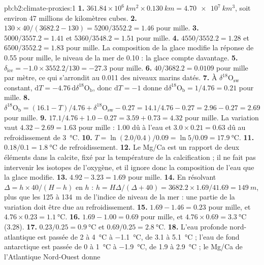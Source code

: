 \begin{solution}{pb:b2:climate-proxies:1}
\textbf{1.} $361.84 \times 10^6\ \unit{km^2} \times \qty{0.130}{km} = \qty{4.70e7}{km^3}$, soit environ 47
millions de kilomètres cubes.
\textbf{2.} $130 \times 40/(3682.2 - 130) = 5200/3552.2 = 1.46$ pour mille.
\textbf{3.} $5000/3557.2 = 1.41$ et $5360/3548.2 = 1.51$ pour mille.
\textbf{4.} $4550/3552.2 = 1.28$ et $6500/3552.2 = 1.83$ pour mille. La composition de la glace
modifie la réponse de \num{0.55} pour mille, le niveau de la mer de \num{0.10} : la glace compte davantage.
\textbf{5.} $\delta_{\mathrm{ice}} = -1.0 \times 3552.2/130 = -27.3$ pour mille.
\textbf{6.} $40/3682.2 = 0.0109$ pour mille par mètre, ce qui s'arrondit au \num{0.011} des niveaux marins
datés.
\textbf{7.} À $\delta^{18}\mathrm{O}_{\mathrm{sw}}$ constant, $\mathrm{d}T = -4.76\,\mathrm{d}\delta^{18}
\mathrm{O}_{\mathrm{b}}$, donc $\mathrm{d}T = -1$ donne $\mathrm{d}\delta^{18}\mathrm{O}_{\mathrm{b}} =
1/4.76 = 0.21$ pour mille.
\textbf{8.} $\delta^{18}\mathrm{O}_{\mathrm{b}} = (16.1 - T)/4.76 + \delta^{18}\mathrm{O}_{\mathrm{sw}}
- 0.27 = 14.1/4.76 - 0.27 = 2.96 - 0.27 = 2.69$ pour mille.
\textbf{9.} $17.1/4.76 + 1.0 - 0.27 = 3.59 + 0.73 = 4.32$ pour mille. La variation vaut $4.32 - 2.69 =
1.63$ pour mille : \num{1.00} dû à l'eau et $3.0 \times 0.21 = 0.63$ dû au refroidissement de
\qty{3}{\celsius}.
\textbf{10.} $T = \ln(2.0/0.4)/0.09 = \ln 5/0.09 = \qty{17.9}{\celsius}$.
\textbf{11.} $0.18/0.1 = \qty{1.8}{\celsius}$ de refroidissement.
\textbf{12.} Le Mg/Ca est un rapport de deux éléments dans la calcite, fixé par la température de la
calcification ; il ne fait pas intervenir les isotopes de l'oxygène, et il ignore donc la composition de
l'eau que la glace modifie.
\textbf{13.} $4.92 - 3.23 = 1.69$ pour mille.
\textbf{14.} En résolvant $\Delta = h \times 40/(H - h)$ en $h$ : $h = H\Delta/(\Delta + 40) = 3682.2
\times 1.69/41.69 = \qty{149}{m}$, plus que les 125 à \qty{134}{m} de l'indice de niveau de la mer :
une partie de la variation doit être due au refroidissement.
\textbf{15.} $1.69 - 1.46 = 0.23$ pour mille, et $4.76 \times 0.23 = \qty{1.1}{\celsius}$.
\textbf{16.} $1.69 - 1.00 = 0.69$ pour mille, et $4.76 \times 0.69 = \qty{3.3}{\celsius}$ (3.28).
\textbf{17.} $0.23/0.25 = \qty{0.9}{\celsius}$ et $0.69/0.25 = \qty{2.8}{\celsius}$.
\textbf{18.} L'eau profonde nord-atlantique est passée de 2 à \qty{4}{\celsius} à \qty{-1.1}{\celsius},
de 3.1 à \qty{5.1}{\celsius} ; l'eau de fond antarctique est passée de 0 à \qty{1}{\celsius} à
\qty{-1.9}{\celsius}, de 1.9 à \qty{2.9}{\celsius} ; le Mg/Ca de l'Atlantique Nord-Ouest donne

\end{solution}
